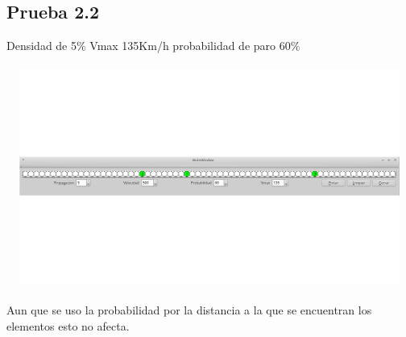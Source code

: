 \documentclass[a4paper,10pt]{article}
\begin{document}
\subsection{Prueba 2.2}
Densidad de 5\% Vmax 135Km/h probabilidad de paro 60\%
\\ \\
\includegraphics[width=15cm, height=7cm]{9}
\\ \\
Aun que se uso la probabilidad por la distancia a la que se encuentran los elementos esto no afecta.
\end{document}
